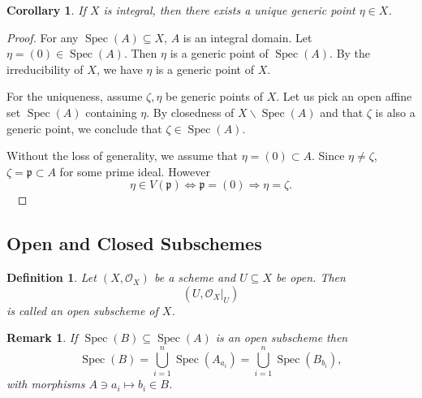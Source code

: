 \documentclass{article}
\newtheorem{definition}{Definition}[section]
\newtheorem{remark}{Remark}[section]
\newtheorem{corollary}{Corollary}[section]
\numberwithin{equation}{section}
\DeclareMathOperator{\Spec}{Spec}
\begin{document}
\begin{corollary}
If $X$ is integral, then there exists a unique generic point $\eta\in X$.
\end{corollary}

\begin{proof}
For any $\Spec(A)\subseteq X$, $A$ is an integral domain. Let $\eta=(0)\in\Spec(A)$. Then $\eta$ is a generic point of $\Spec(A)$. By the irreducibility of $X$, we have $\eta$ is a generic point of $X$.\\
\par For the uniqueness, assume $\zeta,\eta$ be generic points of $X$. Let us pick an open affine set $\Spec(A)$ containing $\eta$. By closedness of $X\backslash\Spec(A)$ and that $\zeta$ is also a generic point, we conclude that $\zeta\in\Spec(A)$.\\
\par Without the loss of generality, we assume that $\eta=(0)\subset A$. Since $\eta\not=\zeta$, $\zeta=\mathfrak{p}\subset A$ for some prime ideal. However
\begin{equation*}
\eta\in V(\mathfrak{p})\Leftrightarrow\mathfrak{p}=(0)\Rightarrow\eta=\zeta.
\end{equation*}\
\end{proof}


\subsection{Open and Closed Subschemes}

\begin{definition}
Let $(X,\mathcal{O}_X)$ be a scheme and $U\subseteq X$ be open. Then
\begin{equation*}
(U,\mathcal{O}_X|_U)
\end{equation*}
is called an open subscheme of $X$. %
\end{definition}

\begin{remark}
If $\Spec(B)\subseteq\Spec(A)$ is an open subscheme then 
\begin{equation*}
\Spec(B)=\bigcup_{i=1}^n \Spec(A_{a_i}) = \bigcup_{i=1}^n \Spec(B_{b_i}),
\end{equation*}
with morphisms $A\ni a_i\mapsto b_i\in B$. %
\end{remark}
\end{document}
